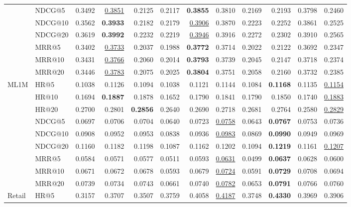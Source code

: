 \begin{tabular}{llrrrrrrrrrr}
 & NDCG@5 & 0.3492 & \underline{0.3851} & 0.2125 & 0.2117 & \textbf{0.3855} & 0.3810 & 0.2169 & 0.2193 & 0.3798 & 0.2460 \\
 & NDCG@10 & 0.3562 & \textbf{0.3933} & 0.2182 & 0.2179 & \underline{0.3906} & 0.3870 & 0.2223 & 0.2252 & 0.3861 & 0.2525 \\
 & NDCG@20 & 0.3619 & \textbf{0.3992} & 0.2232 & 0.2219 & \underline{0.3946} & 0.3916 & 0.2272 & 0.2302 & 0.3910 & 0.2565 \\
 & MRR@5 & 0.3402 & \underline{0.3733} & 0.2037 & 0.1988 & \textbf{0.3772} & 0.3714 & 0.2022 & 0.2122 & 0.3692 & 0.2347 \\
 & MRR@10 & 0.3431 & \underline{0.3766} & 0.2060 & 0.2014 & \textbf{0.3793} & 0.3739 & 0.2045 & 0.2147 & 0.3718 & 0.2374 \\
 & MRR@20 & 0.3446 & \underline{0.3783} & 0.2075 & 0.2025 & \textbf{0.3804} & 0.3751 & 0.2058 & 0.2160 & 0.3732 & 0.2385 \\
\hline
ML1M & HR@5 & 0.1038 & 0.1126 & 0.1094 & 0.1038 & 0.1121 & 0.1144 & 0.1084 & \textbf{0.1168} & 0.1135 & \underline{0.1154} \\
 & HR@10 & 0.1694 & \textbf{0.1887} & 0.1878 & 0.1652 & 0.1790 & 0.1841 & 0.1790 & 0.1850 & 0.1740 & \underline{0.1883} \\
 & HR@20 & 0.2700 & 0.2801 & \textbf{0.2856} & 0.2640 & 0.2690 & 0.2718 & 0.2681 & 0.2764 & 0.2580 & \underline{0.2829} \\
 & NDCG@5 & 0.0697 & 0.0706 & 0.0704 & 0.0640 & 0.0723 & \underline{0.0758} & 0.0643 & \textbf{0.0767} & 0.0753 & 0.0736 \\
 & NDCG@10 & 0.0908 & 0.0952 & 0.0953 & 0.0838 & 0.0936 & \underline{0.0983} & 0.0869 & \textbf{0.0990} & 0.0949 & 0.0969 \\
 & NDCG@20 & 0.1160 & 0.1182 & 0.1198 & 0.1087 & 0.1162 & 0.1202 & 0.1094 & \textbf{0.1219} & 0.1161 & \underline{0.1207} \\
 & MRR@5 & 0.0584 & 0.0571 & 0.0577 & 0.0511 & 0.0593 & \underline{0.0631} & 0.0499 & \textbf{0.0637} & 0.0628 & 0.0600 \\
 & MRR@10 & 0.0671 & 0.0672 & 0.0678 & 0.0593 & 0.0679 & \underline{0.0724} & 0.0591 & \textbf{0.0729} & 0.0708 & 0.0694 \\
 & MRR@20 & 0.0739 & 0.0734 & 0.0743 & 0.0661 & 0.0740 & \underline{0.0782} & 0.0653 & \textbf{0.0791} & 0.0766 & 0.0760 \\
\hline
Retail & HR@5 & 0.3157 & 0.3707 & 0.3507 & 0.3759 & 0.4058 & \underline{0.4187} & 0.3748 & \textbf{0.4330} & 0.3969 & 0.3906 \\

\end{tabular}
